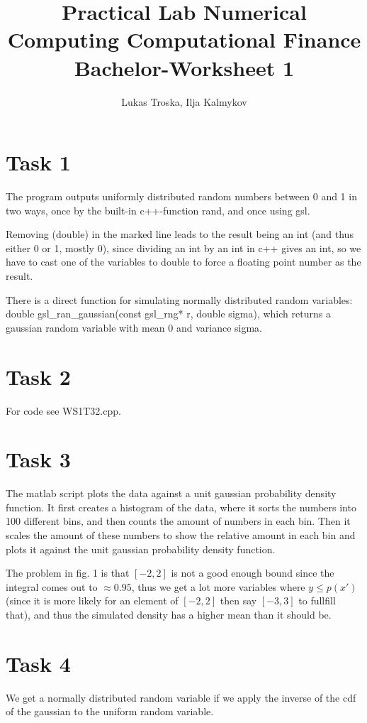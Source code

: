 \documentclass[]{article}
\title{Practical Lab Numerical Computing Computational Finance \\Bachelor-Worksheet 1}
\author{Lukas Troska, Ilja Kalmykov}
\date{}
\begin{document}
\maketitle 
\section*{Task 1} The program outputs uniformly distributed random
numbers between 0 and 1 in two ways, once by the built-in c++-function rand, and
once using gsl.

Removing (double) in the marked line leads to the result being an int (and thus
either 0 or 1, mostly 0), since dividing an int by an int in c++ gives an int,
so we have to cast one of the variables to double to force a floating point
number as the result.

There is a direct function for simulating normally distributed random variables:
double gsl\_ran\_gaussian(const gsl\_rng* r, double sigma), which returns a
gaussian random variable with mean 0 and variance sigma.

\section*{Task 2}
For code see WS1T32.cpp.

\section*{Task 3} The matlab script plots the data against a unit gaussian
probability density function. It first creates a histogram of the data, where it
sorts the numbers into 100 different bins, and then counts the amount of numbers
in each bin. Then it scales the amount of these numbers to show the relative
amount in each bin and plots it against the unit gaussian probability density
function.

The problem in fig. 1 is that $[-2,2]$ is not a good enough bound since the
integral comes out to $\approx 0.95$, thus we get a lot more variables where
$y\le p(x')$ (since it is more likely for an element of $[-2,2]$ then say
$[-3,3]$ to fullfill that), and thus the simulated density has a higher mean
than it should be.

\section*{Task 4} We get a normally distributed random variable if we apply the
inverse of the cdf of the gaussian to the uniform random variable.
\end{document}
